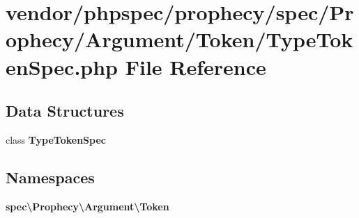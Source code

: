 \section{vendor/phpspec/prophecy/spec/\+Prophecy/\+Argument/\+Token/\+Type\+Token\+Spec.php File Reference}
\label{_type_token_spec_8php}
\subsection*{Data Structures}
\begin{DoxyCompactItemize}
\item 
class {\bf Type\+Token\+Spec}
\end{DoxyCompactItemize}
\subsection*{Namespaces}
\begin{DoxyCompactItemize}
\item 
 {\bf spec\textbackslash{}\+Prophecy\textbackslash{}\+Argument\textbackslash{}\+Token}
\end{DoxyCompactItemize}

